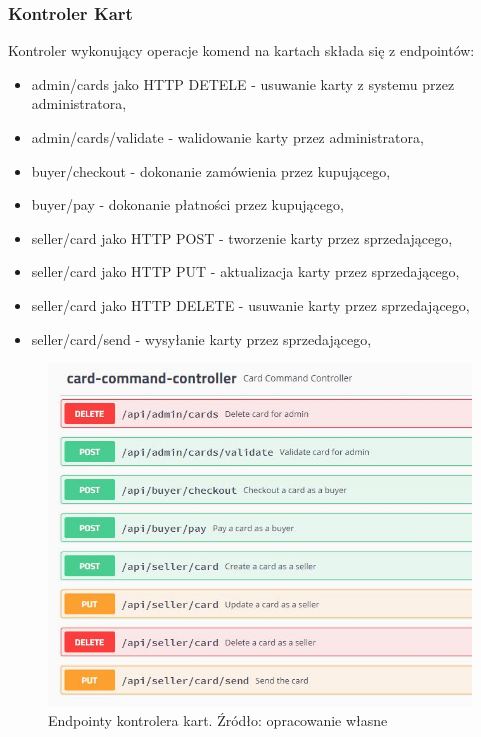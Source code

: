 \subsubsection{Kontroler Kart}
Kontroler wykonujący operacje komend na kartach składa się z endpointów:
\begin{itemize}
    \item admin/cards jako HTTP DETELE - usuwanie karty z systemu przez administratora,
    \item admin/cards/validate - walidowanie karty przez administratora,
    \item buyer/checkout - dokonanie zamówienia przez kupującego,
    \item buyer/pay - dokonanie płatności przez kupującego,
    \item seller/card jako HTTP POST - tworzenie karty przez sprzedającego,
    \item seller/card jako HTTP PUT - aktualizacja karty przez sprzedającego,
    \item seller/card jako HTTP DELETE - usuwanie karty przez sprzedającego,
    \item seller/card/send - wysyłanie karty przez sprzedającego,
\end{itemize}
\begin{figure}[h!]
  \centering
    \includegraphics[width=1.0\textwidth]{images/cardContrApiCommand.JPG}
  \caption{Endpointy kontrolera kart. Źródło: opracowanie własne }
\end{figure}
\FloatBarrier
